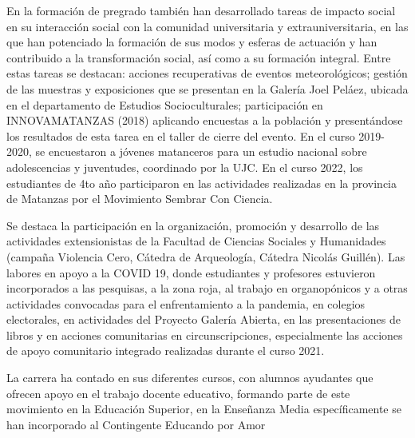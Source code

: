 En la formación de pregrado también han desarrollado tareas de impacto social en su interacción social con la comunidad universitaria y extrauniversitaria, en las que han potenciado la formación de sus modos y esferas de actuación y han contribuido a la transformación social, así como a su formación integral. Entre estas tareas se destacan: acciones recuperativas de eventos meteorológicos; gestión de las muestras y exposiciones que se presentan en la Galería Joel Peláez, ubicada en el departamento de Estudios Socioculturales; participación en INNOVAMATANZAS (2018) aplicando encuestas a la población y presentándose los resultados de esta tarea en el taller de cierre del evento. En el curso 2019-2020, se encuestaron a jóvenes matanceros para un estudio nacional sobre adolescencias y juventudes, coordinado por la UJC. En el curso 2022, los estudiantes de 4to año participaron en las actividades realizadas en la provincia de Matanzas por el Movimiento Sembrar Con Ciencia. 

Se destaca la participación en la organización, promoción y desarrollo de las actividades extensionistas de la Facultad de Ciencias Sociales y Humanidades (campaña Violencia Cero, Cátedra de Arqueología, Cátedra Nicolás Guillén). Las labores en apoyo a la COVID 19, donde estudiantes y profesores estuvieron incorporados a las pesquisas, a la zona roja, al trabajo en organopónicos y a otras actividades convocadas para el enfrentamiento a la pandemia, en colegios electorales, en actividades del Proyecto Galería Abierta, en las presentaciones de libros y en acciones comunitarias en circunscripciones, especialmente las acciones de apoyo comunitario integrado realizadas durante el curso 2021.

La carrera ha contado en sus diferentes cursos, con alumnos ayudantes que ofrecen apoyo en el trabajo docente educativo, formando parte de este movimiento en la Educación Superior, en la Enseñanza Media específicamente se han incorporado al Contingente Educando por Amor 

